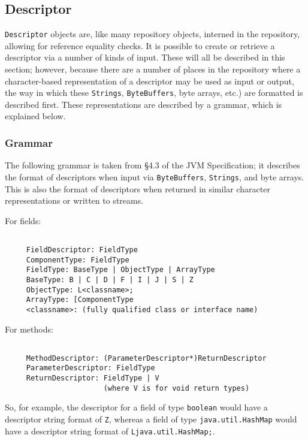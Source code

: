 \documentclass{report}
\begin{document}
\subsection{Descriptor}\label{compdesc}

\texttt{Descriptor} objects are, like many repository objects, 
interned in the repository, allowing for reference equality checks. It is
possible to create or retrieve a descriptor via a number of kinds of input.
These will all be described in this section; however, because there are a 
number of places in the repository where a character-based representation of a 
descriptor may be used as input or output, the way in which these
\texttt{Strings}, \texttt{Byte\-Buff\-ers}, byte arrays, etc.) are formatted is
described first. These representations are described by a grammar, which is
explained below.

\subsubsection{Grammar}

The following grammar is taken from \S 4.3 of the JVM Specification;
it describes the format of descriptors when input via \texttt{Byte\-Buff\-ers},
\texttt{Strings}, and byte arrays. This is also the format of descriptors
when returned in similar character representations or written to streams.

For fields:
\begin{verbatim}

     FieldDescriptor: FieldType
     ComponentType: FieldType
     FieldType: BaseType | ObjectType | ArrayType
     BaseType: B | C | D | F | I | J | S | Z
     ObjectType: L<classname>;
     ArrayType: [ComponentType
     <classname>: (fully qualified class or interface name)

\end{verbatim}
For methods:
\begin{verbatim}

     MethodDescriptor: (ParameterDescriptor*)ReturnDescriptor
     ParameterDescriptor: FieldType
     ReturnDescriptor: FieldType | V
                       (where V is for void return types)
\end{verbatim}

So, for example, the descriptor for a field of type \texttt{boolean} would have
a descriptor string format of \texttt{Z}, whereas a field of type
\texttt{java.util.HashMap} would have a descriptor string format of
\texttt{Ljava.util.HashMap;}.
\end{document}
